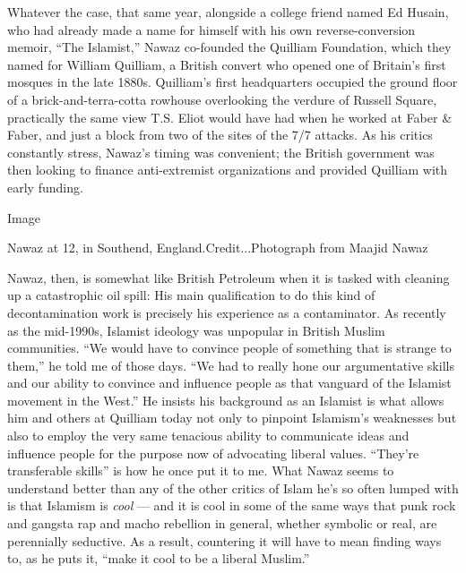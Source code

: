 Whatever the case, that same year, alongside a college friend named Ed
Husain, who had already made a name for himself with his own
reverse-conversion memoir, ``The Islamist,'' Nawaz co-founded the
Quilliam Foundation, which they named for William Quilliam, a British
convert who opened one of Britain's first mosques in the late 1880s.
Quilliam's first headquarters occupied the ground floor of a
brick-and-terra-cotta rowhouse overlooking the verdure of Russell
Square, practically the same view T.S. Eliot would have had when he
worked at Faber \& Faber, and just a block from two of the sites of the
7/7 attacks. As his critics constantly stress, Nawaz's timing was
convenient; the British government was then looking to finance
anti-extremist organizations and provided Quilliam with early funding.

Image

Nawaz at 12, in Southend, England.Credit...Photograph from Maajid Nawaz

Nawaz, then, is somewhat like British Petroleum when it is tasked with
cleaning up a catastrophic oil spill: His main qualification to do this
kind of decontamination work is precisely his experience as a
contaminator. As recently as the mid-1990s, Islamist ideology was
unpopular in British Muslim communities. ``We would have to convince
people of something that is strange to them,'' he told me of those days.
``We had to really hone our argumentative skills and our ability to
convince and influence people as that vanguard of the Islamist movement
in the West.'' He insists his background as an Islamist is what allows
him and others at Quilliam today not only to pinpoint Islamism's
weaknesses but also to employ the very same tenacious ability to
communicate ideas and influence people for the purpose now of advocating
liberal values. ``They're transferable skills'' is how he once put it to
me. What Nawaz seems to understand better than any of the other critics
of Islam he's so often lumped with is that Islamism is \emph{cool} ---
and it is cool in some of the same ways that punk rock and gangsta rap
and macho rebellion in general, whether symbolic or real, are
perennially seductive. As a result, countering it will have to mean
finding ways to, as he puts it, ``make it cool to be a liberal Muslim.''

